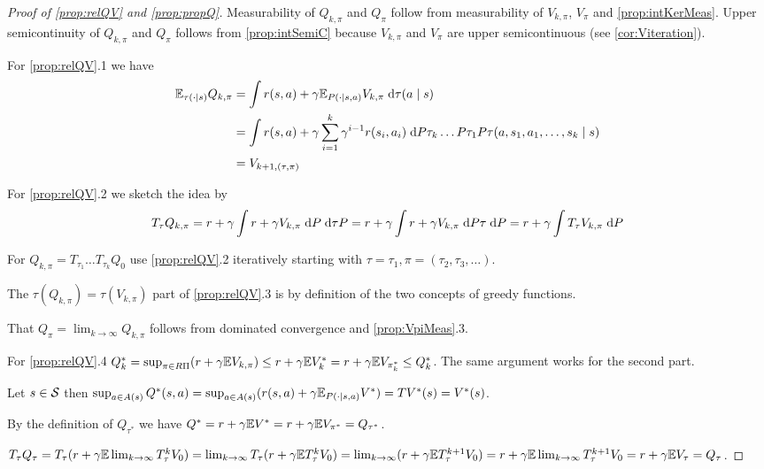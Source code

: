 \begin{proof}[Proof of \cref{prop:relQV} and \cref{prop:propQ}]
  Measurability of $Q_{k, \pi}$ and $Q_\pi$
  follow from measurability of $V_{k, \pi}$, $V_{\pi}$
  and \cref{prop:intKerMeas}.
  Upper semicontinuity of $Q_{k, \pi}$ and $Q_\pi$ follows
  from \cref{prop:intSemiC} because $V_{k, \pi}$ and $V_\pi$ are
  upper semicontinuous (see \cref{cor:Viteration}).

  For \cref{prop:relQV}.1 we have \begin{align*}
    \mathbb{E}_{\tau(\cdot \mid s)} Q_{k, \pi}
    &= \int r(s,a) + \gamma \mathbb{E}_{P(\cdot \mid s, a)} V_{k, \pi}
    \; \mathrm{d} \tau(a \mid s)
    \\ &= \int r(s,a) + \gamma \sum_{i=1}^{k} \gamma^{i-1} r(s_i, a_i)
    \; \mathrm{d} P \tau_k \dots P\tau_1 P\tau(a, s_1, a_1, \dots, s_k \mid s)
  \\ &= V_{k+1, (\tau, \pi)} \end{align*}
  
  For \cref{prop:relQV}.2 we sketch the idea by
  \begin{align*}
    T_\tau Q_{k, \pi} = r + \gamma \int r + \gamma V_{k, \pi}
    \; \mathrm{d} P \; \mathrm{d} \tau P
    = r + \gamma \int r + \gamma V_{k, \pi} \; \mathrm{d} P \tau \; \mathrm{d} P
    = r + \gamma \int T_\tau V_{k, \pi} \; \mathrm{d} P
  \end{align*}
  
  For $Q_{k,\pi} = T_{\tau_1} \dots T_{\tau_k} Q_0$ use \cref{prop:relQV}.2
  iteratively starting with
  $\tau = \tau_1, \pi = (\tau_2, \tau_3, \dots)$.
  
  The $\tau(Q_{k, \pi}) = \tau(V_{k, \pi})$ part of \cref{prop:relQV}.3
  is by definition of the two concepts of
  greedy functions.

  That $Q_\pi = \lim_{k \to \infty} Q_{k, \pi}$
  follows from dominated convergence and
  \cref{prop:VpiMeas}.3.

  For \cref{prop:relQV}.4 $Q_k^* = \sup_{\pi \in R\Pi} (r + \gamma \mathbb{E} V_{k,\pi})
  \leq r + \gamma \mathbb{E} V_k^* = r + \gamma \mathbb{E} V_{\pi_k^*}
  \leq Q_k^*$. The same argument works for the second part.

  Let $s \in \mathcal{S}$ then $\sup_{a \in A(s)} Q^*(s, a) = 
  \sup_{a \in A(s)} (r(s, a) + \gamma \mathbb{E}_{P(\cdot \mid s, a)} V^*)
  = T V^*(s) = V^*(s)$.
  
  By the definition of $Q_{\tau^*}$ we have
  $Q^* = r + \gamma \mathbb{E} V^* = r + \gamma \mathbb{E} V_{\pi^*} = Q_{\tau^*}$.

  $T_\tau Q_\tau = T_\tau (r + \gamma \mathbb{E} \lim_{k\to\infty} T_\tau^k V_0)
  = \lim_{k\to\infty} T_\tau (r + \gamma \mathbb{E} T_\tau^k V_0)
  = \lim_{k\to\infty} (r + \gamma \mathbb{E} T_\tau^{k+1} V_0)
  = r + \gamma \mathbb{E} \lim_{k\to\infty} T^{k+1}_\tau V_0
  = r + \gamma \mathbb{E} V_\tau = Q_\tau$.


\end{proof}
